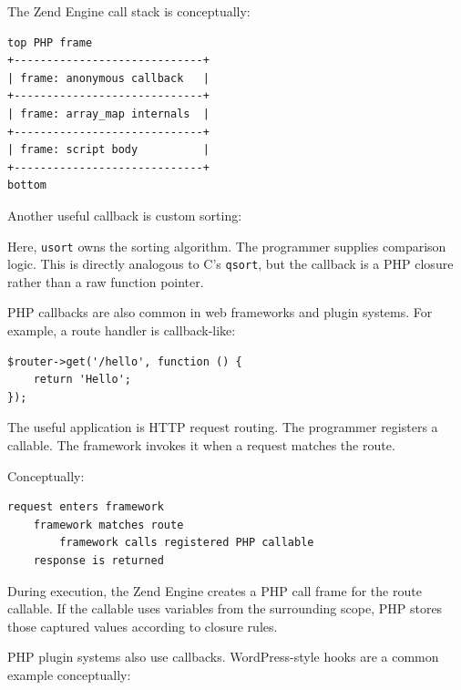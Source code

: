\documentclass[a4paper,twoside]{report}
\begin{document}
The Zend Engine call stack is conceptually:

\begin{verbatim}
top PHP frame
+-----------------------------+
| frame: anonymous callback   |
+-----------------------------+
| frame: array_map internals  |
+-----------------------------+
| frame: script body          |
+-----------------------------+
bottom
\end{verbatim}

Another useful callback is custom sorting:



Here, \texttt{usort} owns the sorting algorithm. The programmer supplies comparison logic. This is directly analogous to C's \texttt{qsort}, but the callback is a PHP closure rather than a raw function pointer.

PHP callbacks are also common in web frameworks and plugin systems. For example, a route handler is callback-like:

\begin{verbatim}
$router->get('/hello', function () {
    return 'Hello';
});
\end{verbatim}

The useful application is HTTP request routing. The programmer registers a callable. The framework invokes it when a request matches the route.

Conceptually:

\begin{verbatim}
request enters framework
    framework matches route
        framework calls registered PHP callable
    response is returned
\end{verbatim}

During execution, the Zend Engine creates a PHP call frame for the route callable. If the callable uses variables from the surrounding scope, PHP stores those captured values according to closure rules.

PHP plugin systems also use callbacks. WordPress-style hooks are a common example conceptually:
\end{document}
